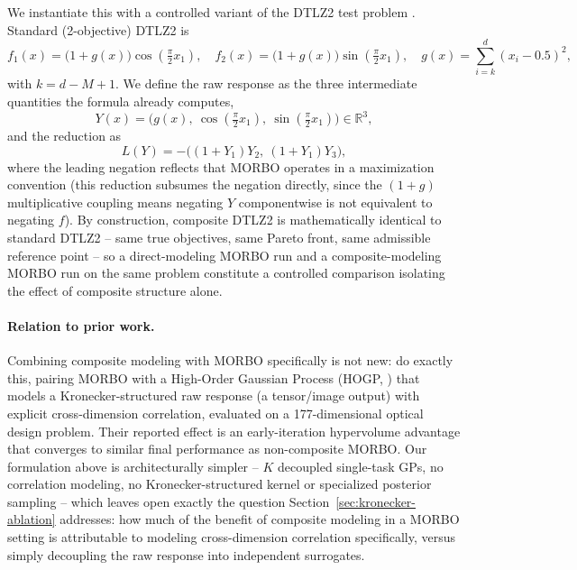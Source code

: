 \documentclass[11pt]{article}
\newcommand{\Reals}{\mathbb{R}}
\begin{document}
We instantiate this with a controlled variant of the DTLZ2 test problem
\citep{deb2002dtlz}. Standard (2-objective) DTLZ2 is
\begin{equation}
  f_1(x) = \big(1+g(x)\big)\cos\!\left(\tfrac{\pi}{2}x_1\right), \quad
  f_2(x) = \big(1+g(x)\big)\sin\!\left(\tfrac{\pi}{2}x_1\right), \quad
  g(x) = \sum_{i=k}^{d} (x_i - 0.5)^2,
\end{equation}
with $k = d - M + 1$. We define the raw response as the three intermediate
quantities the formula already computes,
\begin{equation}
  Y(x) = \big(g(x),\ \cos(\tfrac{\pi}{2}x_1),\ \sin(\tfrac{\pi}{2}x_1)\big) \in \Reals^3,
\end{equation}
and the reduction as
\begin{equation}
  L(Y) = -\big((1+Y_1)Y_2,\ (1+Y_1)Y_3\big),
\end{equation}
where the leading negation reflects that MORBO operates in a maximization
convention (this reduction subsumes the negation directly, since the
$(1+g)$ multiplicative coupling means negating $Y$ componentwise is not
equivalent to negating $f$). By construction, composite DTLZ2 is
mathematically identical to standard DTLZ2 -- same true objectives, same
Pareto front, same admissible reference point -- so a direct-modeling MORBO
run and a composite-modeling MORBO run on the same problem constitute a
controlled comparison isolating the effect of composite structure alone.

\paragraph{Relation to prior work.} Combining composite modeling with MORBO
specifically is not new: \citet{maddox2021hogp} do exactly this, pairing
MORBO with a High-Order Gaussian Process (HOGP, \citealp{zhe2019hogp}) that
models a Kronecker-structured raw response (a tensor/image output) with
explicit cross-dimension correlation, evaluated on a 177-dimensional optical
design problem. Their reported effect is an early-iteration hypervolume
advantage that converges to similar final performance as non-composite
MORBO. Our formulation above is architecturally simpler -- $K$ decoupled
single-task GPs, no correlation modeling, no Kronecker-structured kernel or
specialized posterior sampling -- which leaves open exactly the question
Section~\ref{sec:kronecker-ablation} addresses: how much of the benefit of
composite modeling in a MORBO setting is attributable to modeling
cross-dimension correlation specifically, versus simply decoupling the raw
response into independent surrogates.
\end{document}
